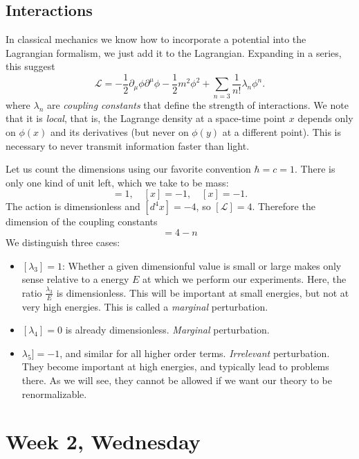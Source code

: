 \documentclass[12pt]{article}
\begin{document}
\subsection{Interactions}

In classical mechanics we know how to incorporate a potential into the
Lagrangian formalism, we just add it to the Lagrangian. Expanding in a
series, this suggest
\begin{equation}
  \mathcal{L} = -\frac{1}{2} 
  \partial_\mu \phi \partial^\mu \phi
  - \frac{1}{2} m^2 \phi^2
  + \sum_{n=3} \frac{1}{n!} \lambda_n \phi^n.
\end{equation}
where $\lambda_n$ are \emph{coupling constants} that define the
strength of interactions. We note that it is \emph{local}, that is,
the Lagrange density at a space-time point $x$ depends only on
$\phi(x)$ and its derivatives (but never on $\phi(y)$ at a different
point). This is necessary to never transmit information faster than
light.

Let us count the dimensions using our favorite convention
$\hbar=c=1$. There is only one kind of unit left, which we take to be
mass:
\begin{equation}
  [m] = 1
  ,\quad
  [x] = -1
  ,\quad
  [x] = -1
  .
\end{equation}
The action is dimensionless and $[d^4x]=-4$, so $[\mathcal{L}] =
4$. Therefore the dimension of the coupling constants
\begin{equation}
  [\lambda_n] = 4-n
\end{equation}
We distinguish three cases:
\begin{itemize}
\item $[\lambda_3] = 1$: Whether a given dimensionful value is small
  or large makes only sense relative to a energy $E$ at which we
  perform our experiments. Here, the ratio $\frac{\lambda_3}{E}$ is
  dimensionless. This will be important at small energies, but not at
  very high energies. This is called a \emph{marginal} perturbation.
\item $[\lambda_4]=0$ is already dimensionless. \emph{Marginal}
  perturbation.
\item $\lambda_5]=-1$, and similar for all higher order
  terms. \emph{Irrelevant} perturbation. They become important at high
  energies, and typically lead to problems there. As we will see, they
  cannot be allowed if we want our theory to be renormalizable.
\end{itemize}


\section{Week 2, Wednesday}
\end{document}
